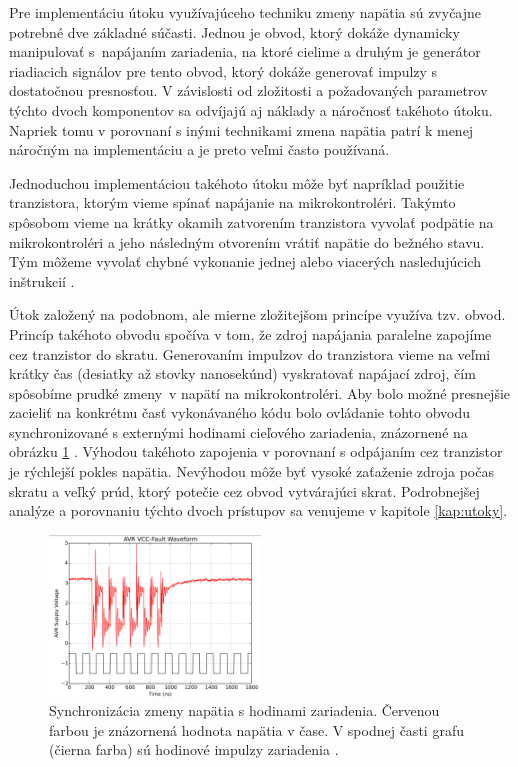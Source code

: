 Pre implementáciu útoku využívajúceho techniku zmeny napätia sú zvyčajne potrebné dve základné súčasti. Jednou je obvod, ktorý dokáže dynamicky manipulovať s~napájaním zariadenia, na ktoré cielime a druhým je generátor riadiacich signálov pre tento obvod, ktorý dokáže generovať impulzy s dostatočnou presnosťou. V závislosti od zložitosti a požadovaných parametrov týchto dvoch komponentov sa odvíjajú aj náklady a náročnosť takéhoto útoku. Napriek tomu v porovnaní s inými technikami zmena napätia patrí k menej náročným na implementáciu a je preto veľmi často používaná. 

Jednoduchou implementáciou takéhoto útoku môže byť napríklad použitie tranzistora, ktorým vieme spínať napájanie na mikrokontroléri. Takýmto spôsobom vieme na krátky okamih zatvorením tranzistora vyvolať podpätie na mikrokontroléri a jeho následným otvorením vrátiť napätie do bežného stavu. Tým môžeme vyvolať chybné vykonanie jednej alebo viacerých nasledujúcich inštrukcií \cite{vccOnTheCheap}.

Útok založený na podobnom, ale mierne zložitejšom princípe využíva tzv.  obvod. Princíp takéhoto obvodu spočíva v tom, že zdroj napájania paralelne zapojíme cez tranzistor do skratu. Generovaním impulzov do tranzistora vieme na veľmi krátky čas (desiatky až stovky nanosekúnd) vyskratovať napájací zdroj, čím spôsobíme prudké zmeny~v napätí na mikrokontroléri. Aby bolo možné presnejšie zacieliť na konkrétnu časť vykonávaného kódu bolo ovládanie tohto obvodu synchronizované s externými hodinami cieľového zariadenia, znázornené na obrázku \ref{obr:vccSync} \cite{crowbars}. Výhodou takéhoto zapojenia v porovnaní s odpájaním cez tranzistor je rýchlejší pokles napätia. Nevýhodou môže byť vysoké zaťaženie zdroja počas skratu a veľký prúd, ktorý potečie cez obvod vytvárajúci skrat. Podrobnejšej analýze a porovnaniu týchto dvoch prístupov sa venujeme v kapitole \ref{kap:utoky}.

\begin{figure}
    \centerline{\includegraphics[width=0.5\textwidth]{images/vccSync.png}}
    \caption[Synchronizácia zmeny napätia s hodinami zariadenia]{Synchronizácia zmeny napätia s hodinami zariadenia. Červenou farbou je znázornená hodnota napätia v čase. V spodnej časti grafu (čierna farba) sú hodinové impulzy zariadenia \cite{crowbars}.}
    \label{obr:vccSync}
\end{figure}

